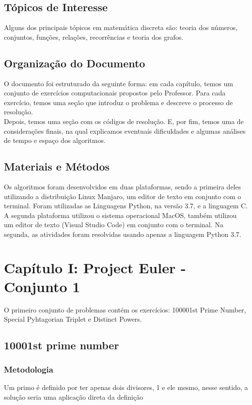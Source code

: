 \documentclass{article}
\begin{document}
    \subsection{Tópicos de Interesse}
    Alguns dos principais tópicos em matemática discreta são: teoria dos números, conjuntos, funções, relações, recorrências e teoria dos grafos.
    
    \subsection{Organização do Documento}
    O documento foi estruturado da seguinte forma: em cada capítulo, temos um conjunto de exercícios computacionais propostos pelo Professor. Para cada exercício, temos uma seção que introduz o problema e descreve o processo de resolução.\\
    Depois, temos uma seção com os códigos de resolução. E, por fim, temos uma de considerações finais, na qual explicamos eventuais dificuldades e algumas análises de tempo e espaço dos algoritmos.\\
    
    \subsection{Materiais e Métodos}
    Os algoritmos foram desenvolvidos em duas plataformas, sendo a primeira deles utilizando a distribuição Linux Manjaro, um editor de texto em conjunto com o terminal. Foram utilizadas as Linguagens Python, na versão 3.7, e a linguagem C. A segunda plataforma utilizou o sistema operacional MacOS, também utilizou um editor de texto (Visual Studio Code) em conjunto com o terminal. Na segunda, as atividades foram resolvidas usando apenas a linguagem Python 3.7.
\clearpage

\section{Capítulo I: Project Euler - Conjunto 1}
O primeiro conjunto de problemas contém os exercícios: 100001st Prime Number, Special Pyhtagorian Triplet e Distinct Powers.
    \subsection{10001st prime number }
       
        \subsubsection{Metodologia} 
        Um primo é definido por ter apenas dois divisores, 1 e ele mesmo, nesse sentido, a solução seria uma aplicação direta da definição
       
\end{document}
